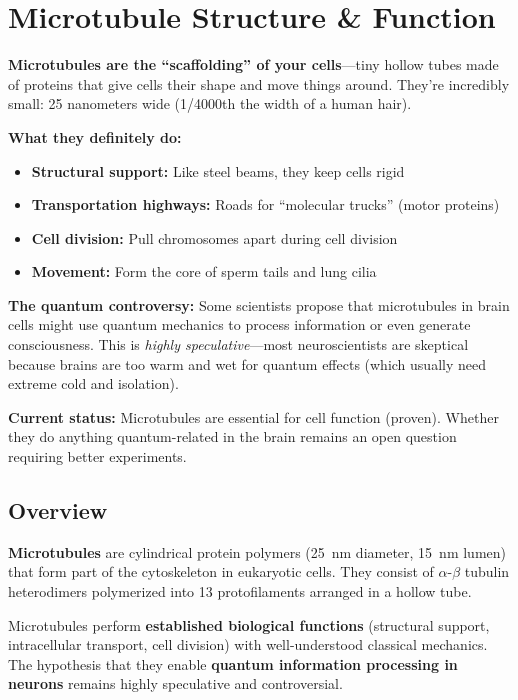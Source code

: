 \chapter{Microtubule Structure \& Function}
\label{ch:microtubule-structure-function}

\begin{nontechnical}
\textbf{Microtubules are the ``scaffolding'' of your cells}---tiny hollow tubes made of proteins that give cells their shape and move things around. They're incredibly small: 25 nanometers wide (1/4000th the width of a human hair).

\textbf{What they definitely do:}
\begin{itemize}
\item \textbf{Structural support:} Like steel beams, they keep cells rigid
\item \textbf{Transportation highways:} Roads for ``molecular trucks'' (motor proteins)
\item \textbf{Cell division:} Pull chromosomes apart during cell division
\item \textbf{Movement:} Form the core of sperm tails and lung cilia
\end{itemize}

\textbf{The quantum controversy:} Some scientists propose that microtubules in brain cells might use quantum mechanics to process information or even generate consciousness. This is \emph{highly speculative}---most neuroscientists are skeptical because brains are too warm and wet for quantum effects (which usually need extreme cold and isolation).

\textbf{Current status:} Microtubules are essential for cell function (proven). Whether they do anything quantum-related in the brain remains an open question requiring better experiments.
\end{nontechnical}

\section{Overview}

\textbf{Microtubules} are cylindrical protein polymers (25~nm diameter, 15~nm lumen) that form part of the cytoskeleton in eukaryotic cells. They consist of $\alpha$-$\beta$ tubulin heterodimers polymerized into 13 protofilaments arranged in a hollow tube.

\begin{keyconcept}
Microtubules perform \textbf{established biological functions} (structural support, intracellular transport, cell division) with well-understood classical mechanics. The hypothesis that they enable \textbf{quantum information processing in neurons} remains highly speculative and controversial.
\end{keyconcept}

